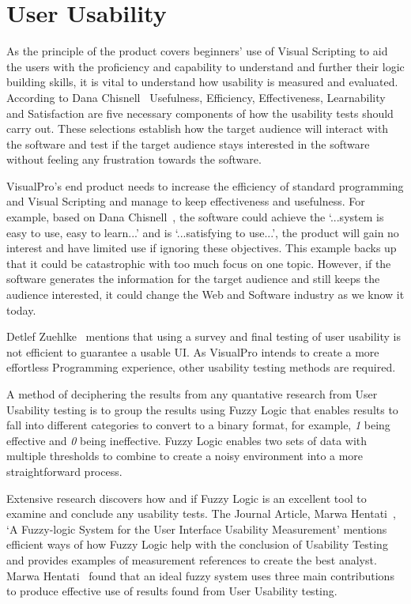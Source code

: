 \documentclass[12pt]{report} %
\begin{document}
	\section{User Usability}
		As the principle of the product covers beginners' use of Visual Scripting to aid the users with the proficiency and capability to understand and further their logic building skills, it is vital to understand how usability is measured and evaluated. According to Dana Chisnell~\cite{chisnell_dana_handbook_2008} Usefulness, Efficiency, Effectiveness, Learnability and Satisfaction are five necessary components of how the usability tests should carry out. These selections establish how the target audience will interact with the software and test if the target audience stays interested in the software without feeling any frustration towards the software. 
			
		VisualPro's end product needs to increase the efficiency of standard programming and Visual Scripting and manage to keep effectiveness and usefulness. For example, based on Dana Chisnell~\cite{chisnell_dana_handbook_2008}, the software could achieve the `...system is easy to use, easy to learn...' and is `...satisfying to use...', the product will gain no interest and have limited use if ignoring these objectives. This example backs up that it could be catastrophic with too much focus on one topic. However, if the software generates the information for the target audience and still keeps the audience interested, it could change the Web and Software industry as we know it today.

		Detlef Zuehlke~\cite{zuehlke_useware_2008} mentions that using a survey and final testing of user usability is not efficient to guarantee a usable UI. As VisualPro intends to create a more effortless Programming experience, other usability testing methods are required.

		A method of deciphering the results from any quantative research from User Usability testing is to group the results using Fuzzy Logic that enables results to fall into different categories to convert to a binary format, for example, \textit{1} being effective and \textit{0} being ineffective. Fuzzy Logic enables two sets of data with multiple thresholds to combine to create a noisy environment into a more straightforward process.

		Extensive research discovers how and if Fuzzy Logic is an excellent tool to examine and conclude any usability tests. The Journal Article, Marwa Hentati~\cite{hentati_fuzzy-logic_2016}, `A Fuzzy-logic System for the User Interface Usability Measurement' mentions efficient ways of how Fuzzy Logic help with the conclusion of Usability Testing and provides examples of measurement references to create the best analyst. Marwa Hentati~\cite{hentati_fuzzy-logic_2016} found that an ideal fuzzy system uses three main contributions to produce effective use of results found from User Usability testing.
		
\end{document}
